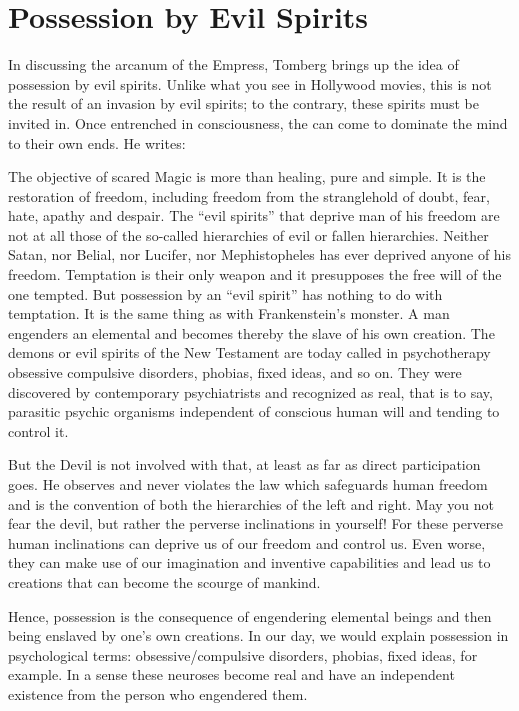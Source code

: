 \section{Possession by Evil Spirits}

In discussing the arcanum of the Empress, Tomberg brings up the idea of possession by evil spirits. Unlike what you see in Hollywood movies, this is not the result of an invasion by evil spirits; to the contrary, these spirits must be invited in. Once entrenched in consciousness, the can come to dominate the mind to their own ends. He writes:

\begin{quotationx}
The objective of scared Magic is more than healing, pure and simple. It is the restoration of freedom, including freedom from the stranglehold of doubt, fear, hate, apathy and despair. The ``evil spirits'' that deprive man of his freedom are not at all those of the so-called hierarchies of evil or fallen hierarchies. Neither Satan, nor Belial, nor Lucifer, nor Mephistopheles has ever deprived anyone of his freedom. Temptation is their only weapon and it presupposes the free will of the one tempted. But possession by an ``evil spirit'' has nothing to do with temptation. It is the same thing as with Frankenstein's monster. A man engenders an elemental and becomes thereby the slave of his own creation. The demons or evil spirits of the New Testament are today called in psychotherapy obsessive compulsive disorders, phobias, fixed ideas, and so on. They were discovered by contemporary psychiatrists and recognized as real, that is to say, parasitic psychic organisms independent of conscious human will and tending to control it.

But the Devil is not involved with that, at least as far as direct participation goes. He observes and never violates the law which safeguards human freedom and is the convention of both the hierarchies of the left and right. May you not fear the devil, but rather the perverse inclinations in yourself! For these perverse human inclinations can deprive us of our freedom and control us. Even worse, they can make use of our imagination and inventive capabilities and lead us to creations that can become the scourge of mankind.
\end{quotationx}


Hence, possession is the consequence of engendering elemental beings and then being enslaved by one's own creations. In our day, we would explain possession in psychological terms: obsessive/compulsive disorders, phobias, fixed ideas, for example. In a sense these neuroses become real and have an independent existence from the person who engendered them.

